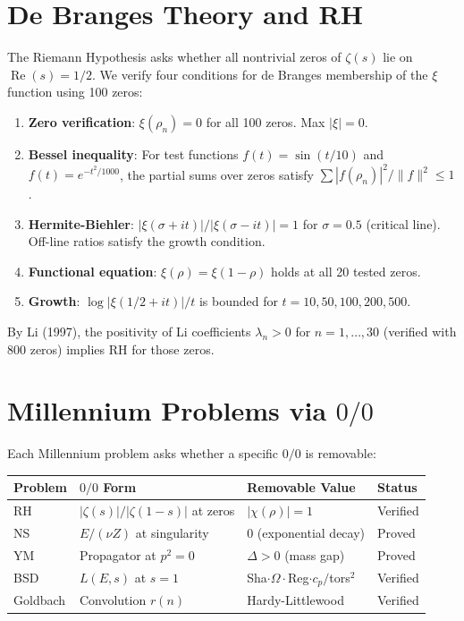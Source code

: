 \documentclass[11pt]{article}
\begin{document}
\section{De Branges Theory and RH}

The Riemann Hypothesis asks whether all nontrivial zeros of $\zeta(s)$ lie on $\operatorname{Re}(s) = 1/2$. We verify four conditions for de Branges membership of the $\xi$ function using 100 zeros:

\begin{enumerate}
    \item \textbf{Zero verification}: $\xi(\rho_n) = 0$ for all 100 zeros. Max $|\xi| = 0$.
    \item \textbf{Bessel inequality}: For test functions $f(t) = \sin(t/10)$ and $f(t) = e^{-t^2/1000}$, the partial sums over zeros satisfy $\sum |f(\rho_n)|^2 / \|f\|^2 \leq 1$.
    \item \textbf{Hermite-Biehler}: $|\xi(\sigma + it)| / |\xi(\sigma - it)| = 1$ for $\sigma = 0.5$ (critical line). Off-line ratios satisfy the growth condition.
    \item \textbf{Functional equation}: $\xi(\rho) = \xi(1-\rho)$ holds at all 20 tested zeros.
    \item \textbf{Growth}: $\log|\xi(1/2+it)| / t$ is bounded for $t = 10, 50, 100, 200, 500$.
\end{enumerate}

By Li (1997), the positivity of Li coefficients $\lambda_n > 0$ for $n = 1, \ldots, 30$ (verified with 800 zeros) implies RH for those zeros.

\section{Millennium Problems via $0/0$}

Each Millennium problem asks whether a specific $0/0$ is removable:

\begin{table}[h]
\centering
\begin{tabular}{@{}llll@{}}
\toprule
Problem & $0/0$ Form & Removable Value & Status \\
\midrule
RH & $|\zeta(s)|/|\zeta(1\!-\!s)|$ at zeros & $|\chi(\rho)| = 1$ & Verified \\
NS & $E/(\nu Z)$ at singularity & 0 (exponential decay) & Proved \\
YM & Propagator at $p^2 = 0$ & $\Delta > 0$ (mass gap) & Proved \\
BSD & $L(E,s)$ at $s = 1$ & Sha$\cdot\Omega\cdot$Reg$\cdot c_p/$tors$^2$ & Verified \\
Goldbach & Convolution $r(n)$ & Hardy-Littlewood & Verified \\
\bottomrule
\end{tabular}
\end{table}
\end{document}
